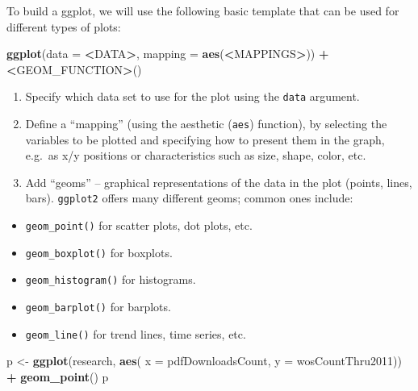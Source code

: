 \documentclass[
]{book}
\newenvironment{Shaded}{\begin{snugshade}}{\end{snugshade}}
\newcommand{\DataTypeTok}[1]{\textcolor[rgb]{0.13,0.29,0.53}{#1}}
\newcommand{\ErrorTok}[1]{\textcolor[rgb]{0.64,0.00,0.00}{\textbf{#1}}}
\newcommand{\KeywordTok}[1]{\textcolor[rgb]{0.13,0.29,0.53}{\textbf{#1}}}
\newcommand{\NormalTok}[1]{#1}
\newcommand{\OperatorTok}[1]{\textcolor[rgb]{0.81,0.36,0.00}{\textbf{#1}}}
\newcommand{\StringTok}[1]{\textcolor[rgb]{0.31,0.60,0.02}{#1}}
\providecommand{\tightlist}{%
  \setlength{\itemsep}{0pt}\setlength{\parskip}{0pt}}
\begin{document}
To build a ggplot, we will use the following basic template that can be used for different types of plots:

\begin{Shaded}
\begin{Highlighting}[]
\KeywordTok{ggplot}\NormalTok{(}\DataTypeTok{data =} \OperatorTok{<}\NormalTok{DATA}\OperatorTok{>}\NormalTok{, }\DataTypeTok{mapping =} \KeywordTok{aes}\NormalTok{(}\OperatorTok{<}\NormalTok{MAPPINGS}\OperatorTok{>}\NormalTok{)) }\OperatorTok{+}\StringTok{  }\ErrorTok{<}\NormalTok{GEOM_FUNCTION}\OperatorTok{>}\NormalTok{()}
\end{Highlighting}
\end{Shaded}

\begin{enumerate}
\def\labelenumi{\arabic{enumi}.}
\item
  Specify which data set to use for the plot using the \texttt{data} argument.
\item
  Define a ``mapping'' (using the aesthetic (\texttt{aes}) function), by selecting the variables to be plotted and specifying how to present them in the graph, e.g.~as x/y positions or characteristics such as size, shape, color, etc.
\item
  Add ``geoms'' -- graphical representations of the data in the plot (points, lines, bars). \texttt{ggplot2} offers many different geoms; common ones include:
\end{enumerate}

\begin{itemize}
\tightlist
\item
  \texttt{geom\_point()} for scatter plots, dot plots, etc.
\item
  \texttt{geom\_boxplot()} for boxplots.
\item
  \texttt{geom\_histogram()} for histograms.
\item
  \texttt{geom\_barplot()} for barplots.
\item
  \texttt{geom\_line()} for trend lines, time series, etc.
\end{itemize}

\begin{Shaded}
\begin{Highlighting}[]
\NormalTok{p <-}\StringTok{ }\KeywordTok{ggplot}\NormalTok{(research, }\KeywordTok{aes}\NormalTok{( }\DataTypeTok{x =}\NormalTok{ pdfDownloadsCount, }\DataTypeTok{y =}\NormalTok{ wosCountThru2011)) }\OperatorTok{+}\StringTok{ }\KeywordTok{geom_point}\NormalTok{()}
\NormalTok{p}
\end{Highlighting}
\end{Shaded}
\end{document}
